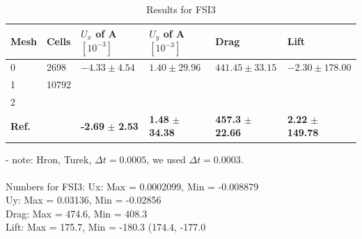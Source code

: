 \begin{table}[!ht]
  \begin{center}
  \begin{tabular}{|l | l | l | l | l | l|} \hline
	Mesh & Cells & $U_x$ of A $[10^{-3}]$ & $U_y$ of A $[10^{-3}]$ & Drag & Lift\\ \hline
    0  & 2698 & $ -4.33 \pm 4.54$ & $ 1.40 \pm 29.96$ & $441.45 \pm 33.15 $ & $-2.30 \pm 178.00$\\   \hline
    1 & 10792 & $ $&  $ $ & $ $ & $ $\\ \hline
    2 &  & $ $&  $ $ & $ $ & $ $   \\ \hline \hline
    \textbf{Ref.}  & & \textbf{-2.69} $\pm$ \textbf{2.53} & \textbf{1.48} $\pm$ \textbf{34.38} & \textbf{457.3} $\pm$ \textbf{22.66} & \textbf{2.22} $\pm$ \textbf{149.78}\\ \hline 
    \hline

  \end{tabular}
	  \caption{Results for FSI3}
  \end{center}
\end{table}
- note: Hron, Turek, $\Delta t = 0.0005$, we used $\Delta t = 0.0003$. \\ \\
Numbers for FSI3:
Ux: Max = 0.0002099, Min = -0.008879 \\
Uy: Max = 0.03136, Min = -0.02856 \\
Drag: Max = 474.6, Min = 408.3 \\
Lift: Max = 175.7, Min = -180.3 (174.4, -177.0\\
